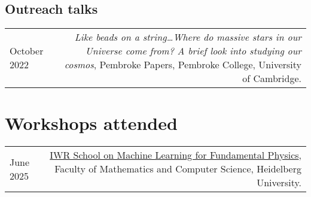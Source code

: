 \documentclass{article}
\begin{document}
\subsection*{Outreach talks}
\begin{longtable}{L!{\vrule}R}

  October 2022 & \textit{Like beads on a string\ldots Where do massive stars in our Universe come from? A brief look into studying our cosmos}, Pembroke Papers, Pembroke College, University of Cambridge. \\

\end{longtable}

\begin{comment}
\section*{Posters Presentations}

\begin{longtable}{L!{\vrule}R}
	March 2021 & \href{https://github.com/htjb/Talks/blob/master/Posters/SKA_globalemu_March_2021/globalemu.pdf}{\textit{globalemu: A novel and robust approach for emulating the sky averaged 21-cm signal from the cosmic dawn and epoch of reionization}}, A Precursor View of the SKA Sky, Virtual Conference\\
	December 2019 & \href{https://drive.google.com/file/d/1dvgumyu4cXxXqoYxikU3DKOa4u_gpGzn/view}{\textit{REACH: Radio Experiment for the Analysis of Cosmic Hydrogen}}, Science At Low Frequencies VI, Arizona State University \\
	November 2019 & \href{https://github.com/htjb/Talks/blob/master/Posters/Cav_Graduate_Conf_REACH_Nov_2019/REACH_poster.pdf}{\textit{REACH: Radio Experiment for the Analysis of Cosmic Hydrogen}}, Cavendish Graduate Conference, University of Cambridge
\end{longtable}
\end{comment}

\section*{Workshops attended}
\begin{longtable}{L!{\vrule}R}
    June 2025 & \href{https://indico.physi.uni-heidelberg.de/event/1053/}{IWR School on Machine Learning for Fundamental Physics}, Faculty of Mathematics and Computer Science, Heidelberg University. \\

\end{longtable}
\end{document}
